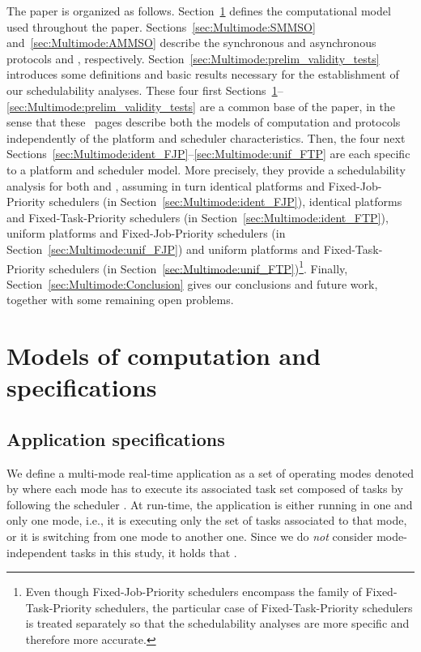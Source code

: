 \documentclass{article}
\newtheorem{validity test}{Validity Test}
\begin{document}
The paper is organized as follows. Section~\ref{sec:Multimode:Models_of_computation} defines the computational model used throughout the paper. Sections~\ref{sec:Multimode:SMMSO} and~\ref{sec:Multimode:AMMSO} describe the synchronous and asynchronous protocols  and , respectively. Section~\ref{sec:Multimode:prelim_validity_tests} introduces some definitions and basic results necessary for the establishment of our schedulability analyses. These four first Sections~\ref{sec:Multimode:Models_of_computation}--\ref{sec:Multimode:prelim_validity_tests} are a common base of the paper, in the sense that these~\pageref{sec:Multimode:ident_FJP} pages describe both the models of computation and protocols independently of the platform and scheduler characteristics. Then, the four next Sections~\ref{sec:Multimode:ident_FJP}--\ref{sec:Multimode:unif_FTP} are each specific to a platform and scheduler model. More precisely, they provide a schedulability analysis for both  and , assuming in turn identical platforms and Fixed-Job-Priority schedulers (in Section~\ref{sec:Multimode:ident_FJP}), identical platforms and Fixed-Task-Priority schedulers (in Section~\ref{sec:Multimode:ident_FTP}), uniform platforms and Fixed-Job-Priority schedulers (in Section~\ref{sec:Multimode:unif_FJP}) and uniform platforms and Fixed-Task-Priority schedulers (in Section~\ref{sec:Multimode:unif_FTP})\footnote{Even though Fixed-Job-Priority schedulers encompass the family of Fixed-Task-Priority schedulers, the particular case of Fixed-Task-Priority schedulers is treated separately so that the schedulability analyses are more specific and therefore more accurate.}. Finally, Section~\ref{sec:Multimode:Conclusion} gives our conclusions and future work, together with some remaining open problems. 








\section{Models of computation and specifications}
\label{sec:Multimode:Models_of_computation}

\subsection{Application specifications}

We define a multi-mode real-time application  as a set of  operating modes denoted by  where each mode  has to execute its associated task set  composed of  tasks by following the scheduler . At run-time, the application is either running in one and only one mode, i.e., it is executing only the set of tasks associated to that mode, or it is switching from one mode to another one. Since we do \emph{not} consider mode-independent tasks in this study, it holds that . 
\end{document}
